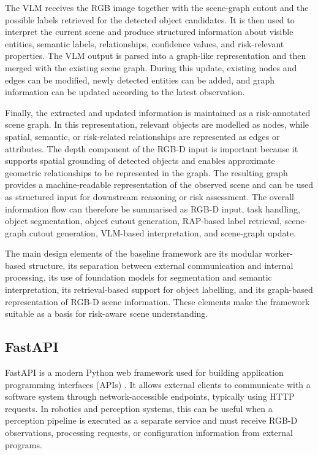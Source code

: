 {The VLM receives the RGB image together with the scene-graph cutout and the possible labels retrieved for the detected object candidates. It is then used to interpret the current scene and produce structured information about visible entities, semantic labels, relationships, confidence values, and risk-relevant properties. The VLM output is parsed into a graph-like representation and then merged with the existing scene graph. During this update, existing nodes and edges can be modified, newly detected entities can be added, and graph information can be updated according to the latest observation.

Finally, the extracted and updated information is maintained as a risk-annotated scene graph. In this representation, relevant objects are modelled as nodes, while spatial, semantic, or risk-related relationships are represented as edges or attributes. The depth component of the RGB-D input is important because it supports spatial grounding of detected objects and enables approximate geometric relationships to be represented in the graph. The resulting graph provides a machine-readable representation of the observed scene and can be used as structured input for downstream reasoning or risk assessment. The overall information flow can therefore be summarised as RGB-D input, task handling, object segmentation, object cutout generation, RAP-based label retrieval, scene-graph cutout generation, VLM-based interpretation, and scene-graph update.

The main design elements of the baseline framework are its modular worker-based structure, its separation between external communication and internal processing, its use of foundation models for segmentation and semantic interpretation, its retrieval-based support for object labelling, and its graph-based representation of RGB-D scene information. These elements make the framework suitable as a basis for risk-aware scene understanding.

}
\subsection{FastAPI}

FastAPI is a modern Python web framework used for building application programming interfaces (APIs) \cite{fastapi_docs}. It allows external clients to communicate with a software system through network-accessible endpoints, typically using HTTP requests. In robotics and perception systems, this can be useful when a perception pipeline is executed as a separate service and must receive RGB-D observations, processing requests, or configuration information from external programs.

